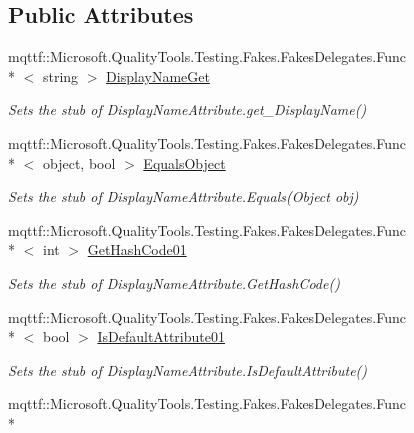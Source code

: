 \subsection*{Public Attributes}
\begin{DoxyCompactItemize}
\item 
mqttf\-::\-Microsoft.\-Quality\-Tools.\-Testing.\-Fakes.\-Fakes\-Delegates.\-Func\\*
$<$ string $>$ \hyperlink{class_system_1_1_component_model_1_1_fakes_1_1_stub_display_name_attribute_a5f9f41455af8d1c18dab7a5b4b0224ba}{Display\-Name\-Get}
\begin{DoxyCompactList}\small\item\em Sets the stub of Display\-Name\-Attribute.\-get\-\_\-\-Display\-Name()\end{DoxyCompactList}\item 
mqttf\-::\-Microsoft.\-Quality\-Tools.\-Testing.\-Fakes.\-Fakes\-Delegates.\-Func\\*
$<$ object, bool $>$ \hyperlink{class_system_1_1_component_model_1_1_fakes_1_1_stub_display_name_attribute_aace7daba511464f55ba96b1b59ac8fd6}{Equals\-Object}
\begin{DoxyCompactList}\small\item\em Sets the stub of Display\-Name\-Attribute.\-Equals(\-Object obj)\end{DoxyCompactList}\item 
mqttf\-::\-Microsoft.\-Quality\-Tools.\-Testing.\-Fakes.\-Fakes\-Delegates.\-Func\\*
$<$ int $>$ \hyperlink{class_system_1_1_component_model_1_1_fakes_1_1_stub_display_name_attribute_ac18573275a8b5750a08eaa64dc6b4a12}{Get\-Hash\-Code01}
\begin{DoxyCompactList}\small\item\em Sets the stub of Display\-Name\-Attribute.\-Get\-Hash\-Code()\end{DoxyCompactList}\item 
mqttf\-::\-Microsoft.\-Quality\-Tools.\-Testing.\-Fakes.\-Fakes\-Delegates.\-Func\\*
$<$ bool $>$ \hyperlink{class_system_1_1_component_model_1_1_fakes_1_1_stub_display_name_attribute_a8dcc6bfd3d0b520f2684e65504867da5}{Is\-Default\-Attribute01}
\begin{DoxyCompactList}\small\item\em Sets the stub of Display\-Name\-Attribute.\-Is\-Default\-Attribute()\end{DoxyCompactList}\item 
mqttf\-::\-Microsoft.\-Quality\-Tools.\-Testing.\-Fakes.\-Fakes\-Delegates.\-Func\\*

\end{DoxyCompactItemize}
